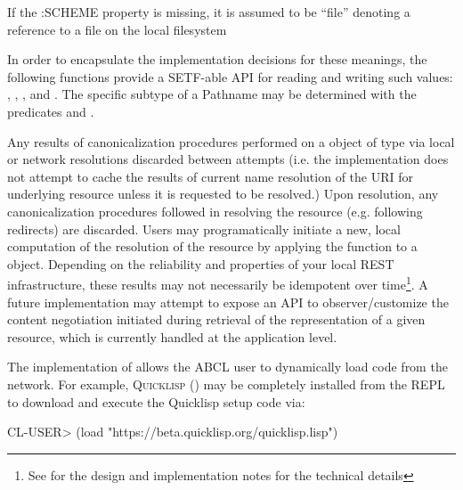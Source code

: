 \documentclass[10pt]{book}
\begin{document}
If the :SCHEME property is missing, it is assumed to be ``file''
denoting a reference to a file on the local filesystem
  
In order to encapsulate the implementation decisions for these
meanings, the following functions provide a SETF-able API for
reading and writing such values: ,
, , and
.  The specific subtype of a Pathname may
be determined with the predicates  and
.

\label{EXTENSIONS:URL-PATHNAME-SCHEME}

\label{EXTENSIONS:URL-PATHNAME-FRAGMENT}

\label{EXTENSIONS:URL-PATHNAME-AUTHORITY}

\label{EXTENSIONS:PATHNAME-URL-P}

\label{EXTENSIONS:URL-PATHNAME-QUERY}

Any results of canonicalization procedures performed on a object of
type  via local or network resolutions
discarded between attempts (i.e. the implementation does not attempt
to cache the results of current name resolution of the URI for
underlying resource unless it is requested to be resolved.)  Upon
resolution, any canonicalization procedures followed in resolving the
resource (e.g. following redirects) are discarded.  Users may
programatically initiate a new, local computation of the resolution of
the resource by applying the  function to a
 object.  Depending on the reliability and
properties of your local \textsc{REST} infrastructure, these results
may not necessarily be idempotent over time\footnote {See
\cite{uri-pathname} for the design and implementation notes for the
technical details}.  A future implementation may attempt to expose an
API to observer/customize the content negotiation initiated during
retrieval of the representation of a given resource, which is
currently handled at the application level.

The implementation of  allows the \textsc{ABCL}
user to dynamically load code from the network.  For example,
\textsc{Quicklisp} (\cite{quicklisp}) may be completely installed from
the \textsc{REPL} to download and execute the Quicklisp setup code via:

\begin{listing-lisp}
  CL-USER> (load "https://beta.quicklisp.org/quicklisp.lisp")
\end{listing-lisp}
\end{document}
